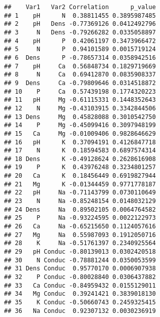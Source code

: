\documentclass[
]{article}
\newenvironment{Shaded}{\begin{snugshade}}{\end{snugshade}}
\newcommand{\CommentTok}[1]{\textcolor[rgb]{0.56,0.35,0.01}{\textit{#1}}}
\newcommand{\FunctionTok}[1]{\textcolor[rgb]{0.13,0.29,0.53}{\textbf{#1}}}
\newcommand{\NormalTok}[1]{#1}
\newcommand{\OtherTok}[1]{\textcolor[rgb]{0.56,0.35,0.01}{#1}}
\newcommand{\SpecialCharTok}[1]{\textcolor[rgb]{0.81,0.36,0.00}{\textbf{#1}}}
\newcommand{\StringTok}[1]{\textcolor[rgb]{0.31,0.60,0.02}{#1}}
\begin{document}
\begin{verbatim}
##    Var1   Var2 Correlation      p_value
## 1    pH      N  0.38811455 0.3895987485
## 2    pH   Dens -0.77369126 0.0412492796
## 3     N   Dens -0.79266282 0.0335058897
## 4    pH      P  0.42061197 0.3473966472
## 5     N      P  0.94101589 0.0015719124
## 6  Dens      P -0.78657314 0.0358942516
## 7    pH     Ca  0.56848734 0.1829719669
## 8     N     Ca  0.69412870 0.0835908337
## 9  Dens     Ca -0.79809646 0.0314518872
## 10    P     Ca  0.57439198 0.1774320223
## 11   pH     Mg -0.61115331 0.1448352643
## 12    N     Mg -0.43103915 0.3342844506
## 13 Dens     Mg  0.45828088 0.3010542750
## 14    P     Mg -0.45099416 0.3097948199
## 15   Ca     Mg -0.01009406 0.9828646629
## 16   pH      K  0.37094191 0.4126847718
## 17    N      K  0.18594583 0.6897574314
## 18 Dens      K -0.49128624 0.2628616908
## 19    P      K  0.43976248 0.3234801257
## 20   Ca      K  0.18456449 0.6919827944
## 21   Mg      K -0.01344459 0.9771778187
## 22   pH     Na -0.71143799 0.0730110649
## 23    N     Na -0.85248154 0.0148032129
## 24 Dens     Na  0.89502105 0.0064764582
## 25    P     Na -0.93224595 0.0022122973
## 26   Ca     Na -0.65215650 0.1124057616
## 27   Mg     Na  0.55987093 0.1912050716
## 28    K     Na -0.51761397 0.2340925564
## 29   pH Conduc -0.80139013 0.0302420518
## 30    N Conduc -0.78881244 0.0350053599
## 31 Dens Conduc  0.95770170 0.0006907938
## 32    P Conduc -0.80028840 0.0306437882
## 33   Ca Conduc -0.84959432 0.0155129011
## 34   Mg Conduc  0.39241421 0.3839018130
## 35    K Conduc -0.50660743 0.2459325415
## 36   Na Conduc  0.92307132 0.0030236919
\end{verbatim}

\begin{Shaded}
\end{Shaded}
\end{document}
